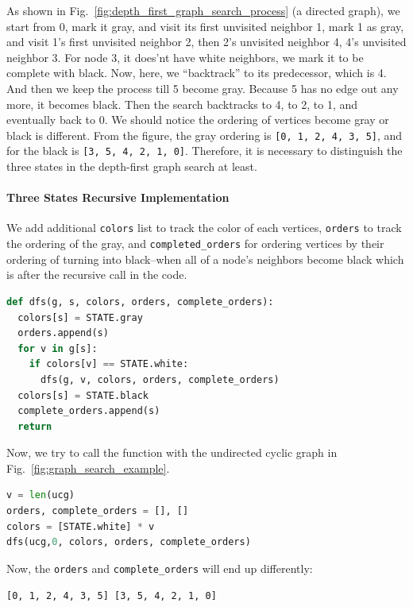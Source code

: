 \documentclass[../main.tex]{subfiles}
\begin{document}
As shown in Fig.~\ref{fig:depth_first_graph_search_process} (a directed graph), we
start from 0, mark it gray, and visit its first unvisited neighbor 1, mark 1 as gray, and visit 1's first unvisited neighbor 2, then 2's unvisited neighbor 4, 4's unvisited neighbor 3.  
For node 3, it does'nt have white neighbors, we mark it to be complete with black. 
Now, here, we ``backtrack'' to its predecessor, which is 4. And then we keep the process till 5 become gray. 
Because 5 has no edge out any more, it becomes black. 
Then the search backtracks to 4, to 2, to 1, and eventually back to 0. 
We should notice the ordering of vertices become gray or black is different. 
From the figure, the gray ordering is \texttt{[0, 1, 2, 4, 3, 5]}, and for the black is \texttt{[3, 5, 4, 2, 1, 0]}. 
Therefore, it is necessary to distinguish the three states in the depth-first graph search at least. 


\paragraph{Three States Recursive Implementation} 
We add additional \texttt{colors} list to track the color of each vertices, \texttt{orders} to track the ordering of the gray, and \texttt{completed\_orders} for ordering vertices by their ordering of turning into black--when all of a node's neighbors become black which is after the recursive call in the code.  
\begin{lstlisting}[language = Python]
def dfs(g, s, colors, orders, complete_orders):
  colors[s] = STATE.gray
  orders.append(s)
  for v in g[s]:
    if colors[v] == STATE.white:
      dfs(g, v, colors, orders, complete_orders)
  colors[s] = STATE.black
  complete_orders.append(s)
  return
\end{lstlisting}
Now, we try to call the function with the undirected cyclic graph in Fig.~\ref{fig:graph_search_example}.
\begin{lstlisting}[language=Python]
v = len(ucg)
orders, complete_orders = [], []
colors = [STATE.white] * v
dfs(ucg,0, colors, orders, complete_orders)
\end{lstlisting}
Now, the \texttt{orders} and \texttt{complete\_orders} will end up differently:
\begin{lstlisting}[numbers=none]
[0, 1, 2, 4, 3, 5] [3, 5, 4, 2, 1, 0]
\end{lstlisting}
\end{document}
